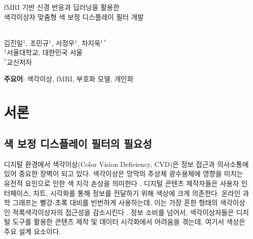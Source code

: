 \documentclass[12pt,a4paper]{article}
\date{}  %
\begin{document}

\thispagestyle{empty} %

\begin{center}
{\Large
{}
\parbox{\textwidth}{\centering
fMRI 기반 신경 반응과 딥러닝을 활용한 \\[1.2em]
색각이상자 맞춤형 색 보정 디스플레이 필터 개발
}} \\[8ex]

{\large 김진일$^{1}$, 조민규$^{1}$, 서정우$^{1}$, 차지욱$^{1*}$} \\[3ex]
{\small
$^{1}$서울대학교, 대한민국 서울 \\
$^{*}$교신저자
}
\end{center}

\begin{abstract}
색각이상(CVD)은 남성의 약 8\%에 영향을 미치지만, 신경 메커니즘과 개인 간 변이성은 잘 이해되지 않고 있다. 우리는 CVD 개인이 망막 결함에도 불구하고 신경 색 변별력을 유지하는지, CVD가 개인화된 중재를 필요로 하는 개인 간 이질성을 보이는지, 그리고 신경 프로파일이 필터 설계에 정보를 제공할 수 있는지 조사했다. fMRI와 순방향 부호화 모델을 사용하여, 우리는 3명의 CVD 참가자와 5명의 건강한 대조군의 초기 시각 피질(V1-hV4)에서 색 표상을 특성화했다. 3차원 신경 분석은 CVD에서 보존된 색 변별력을 드러냈다. 피험자별 선형 변환은 훈련 데이터에 회고적으로 적용되었을 때 97.2\% 기하학적 정렬과 유의미하게 높은 구조적 회복을 달성했다. 이러한 발견은 개인화된 신경 기반 변환의 신경생리학적 및 계산적 타당성을 지지하는 증거를 제공한다. 그러나, 필터링된 자극에 대한 전향적 행동 검증과 독립 테스트 데이터를 사용한 검증이 여전히 수행되어야 한다.
\end{abstract}

\textbf{주요어}: 색각이상, fMRI, 부호화 모델, 개인화


\section{서론}

\subsection{색 보정 디스플레이 필터의 필요성}

디지털 환경에서 색각이상(Color Vision Deficiency, CVD)은 정보 접근과 의사소통에 있어 중요한 장벽이 되고 있다. 색각이상은 망막의 추상체 광수용체에 영향을 미치는 유전적 요인으로 인한 색 지각 손상을 의미한다 \parencite{Asadi2022}. 디지털 콘텐츠 제작자들은 사용자 인터페이스, 차트, 시각화를 통해 정보를 전달하기 위해 색상에 크게 의존한다. 온라인 과학 그래프는 빨강-초록 대비를 빈번하게 사용하는데, 이는 가장 흔한 형태의 색각이상인 적록색각이상자의 접근성을 감소시킨다 \parencite{Wong2011}. 정보 소비를 넘어서, 색각이상자들은 디지털 도구를 활용한 콘텐츠 제작 및 데이터 시각화에서 어려움을 겪는데, 여기서 색상은 주요 설계 요소이다.
\end{document}

